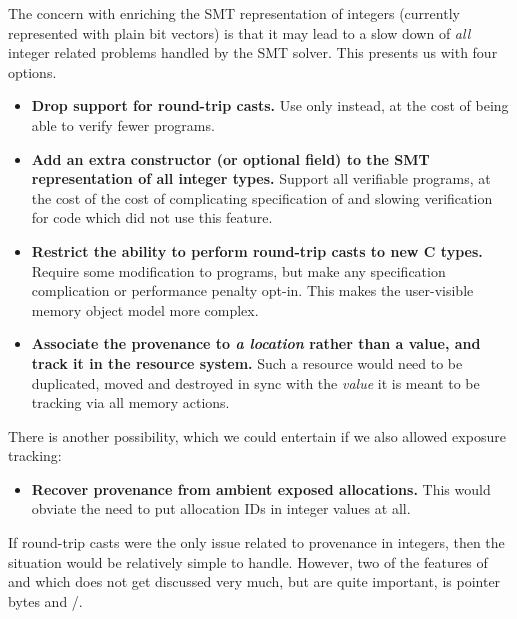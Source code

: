 The concern with enriching the SMT representation of integers (currently
represented with plain bit vectors) is that it may lead to a slow down of
\emph{all} integer related problems handled by the SMT solver. This presents us
with four options.
\begin{itemize}
    \item \textbf{Drop support for round-trip casts.} Use only
         instead, at the cost of being able
        to verify fewer programs.
    \item \textbf{Add an extra constructor (or optional field) to the SMT
        representation of all integer types.} Support all  verifiable
        programs, at the cost of the cost of complicating specification of
        and slowing verification for code which did not use this feature.
    \item \textbf{Restrict the ability to perform round-trip casts to new C
        types.} Require some modification to  programs, but
        make any specification complication or performance penalty opt-in. This
        makes the user-visible memory object model more complex.\label{sn:optin-typedef-subtype}
    \item \textbf{Associate the provenance to \emph{a location} rather than a
        value, and track it in the resource system.} Such a resource would need
        to be duplicated, moved and destroyed in sync with the \emph{value} it
        is meant to be tracking via all memory actions.
\end{itemize}

There is another possibility, which we could entertain if we also allowed
exposure tracking:
\begin{itemize}
    \item \textbf{Recover provenance from ambient exposed allocations.} This
        would obviate the need to put allocation IDs in integer values at all.
\end{itemize}

If round-trip casts were the only issue related to provenance in integers, then
the situation would be relatively simple to handle. However, two of the
features of  and  which does not get discussed very
much, but are quite important, is pointer bytes and
/.

